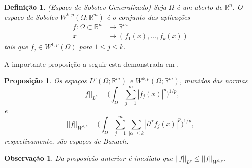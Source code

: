 \documentclass[12pt]{book}
\newtheorem{definicao}[teorema]{Definição}
\newtheorem{observacao}[teorema]{Observação}
\newtheorem{proposicao}[teorema]{Proposição}
\newcommand{\espacoLpcontradominio}[2]{L^{p}(#1;#2)}
\newcommand{\espacosobolev}[1]{W^{1,p}(#1)}
\newcommand{\espacosobolevgeneralizadocontra}[2]{W^{k,p}(#1; #2)}
\newcommand{\normaLp}[1]{||#1||_{L^{p}}}
\newcommand{\normaLpdefinicao}[2]{ \Big(\int_{#2}#1^{p}\Big)^{1/p}}
\newcommand{\normaWpgeneralizado}[1]{||#1||_{W^{k,p}}}
\newcommand{\real}[1]{\mathbb{R}^{#1}}
\begin{document}
	\begin{definicao}\label{definicao_espalo_sobolev_generalizado}
		(Espaço de Sobolev Generalizado) Seja $\Omega$ é um aberto de $\real{n}$. O espaço de Sobolev $\espacosobolevgeneralizadocontra{\Omega}{\real{m}}$ é o conjunto das aplicações  
		$$
		\begin{aligned}
		f:\Omega \subset\real{n} &\to \real{m}
		\\
		x &\mapsto (f_{1}(x), \dots, f_{k}(x))
		\end{aligned}
		$$ 
		tais que $f_{j} \in \espacosobolev{\Omega}$ para $1\leq j \leq k$.
	\end{definicao}
	
	A importante proposição a seguir esta demonstrada em \cite{breazis_sobolev_spaces}.
	
	\begin{proposicao}
		Os espaços $\espacoLpcontradominio{\Omega}{\real{m}}$ e $\espacosobolevgeneralizadocontra{\Omega}{\real{m}}$, munidos das normas 
		$$
		\normaLp{f} =\normaLpdefinicao{\sum_{j=1}^{m} |f_{j}(x)|}{\Omega},
		$$
		e
		$$
		\normaWpgeneralizado{f} =\normaLpdefinicao{\sum_{j=1}^{m} \sum_{|\alpha|\leq k}|\partial^{\alpha}f_{j}(x)|}{\Omega},
		$$
		respectivamente, são espaços de Banach.
	\end{proposicao}
	
	
	\begin{observacao}
		Da proposição anterior é imediato que $\normaLp{f} \leq \normaWpgeneralizado{f}$.
	\end{observacao}
	
\end{document}
